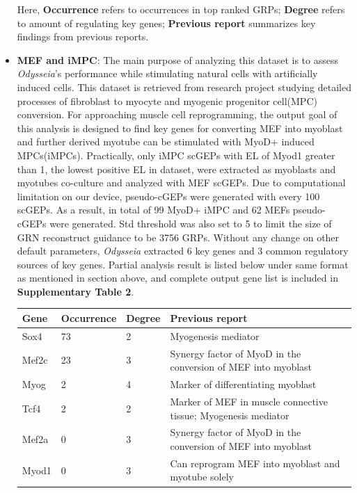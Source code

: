 \documentclass[fleqn,10pt]{wlscirep}
\begin{document}
\begin{itemize}
Here, \textbf{Occurrence} refers to occurrences in top ranked GRPs; \textbf{Degree} refers to amount of regulating key genes; \textbf{Previous report} summarizes key findings from previous reports.

\item \textbf{MEF and iMPC}:
The main purpose of analyzing this dataset is to assess \emph{Odysseia}'s performance while stimulating natural cells with artificially induced cells.
This dataset is retrieved from research project studying detailed processes of fibroblast to myocyte and myogenic progenitor cell(MPC) conversion.\cite{mef_iMPC_ETH}
For approaching muscle cell reprogramming, the output goal of this analysis is designed to find key genes for converting MEF into myoblast and further derived myotube can be stimulated with MyoD+ induced MPCs(iMPCs)\cite{mpc_as_myoblast}.
Practically, only iMPC scGEPs with EL of Myod1 greater than 1, the lowest positive EL in dataset, were extracted as myoblasts and myotubes co-culture and analyzed with MEF scGEPs.
Due to computational limitation on our device, pseudo-cGEPs were generated with every 100 scGEPs.
As a result, in total of 99 MyoD+ iMPC and 62 MEFs pseudo-cGEPs were generated.
Std threshold was also set to 5 to limit the size of GRN reconstruct guidance to be 3756 GRPs.
Without any change on other default parameters, \emph{Odysseia} extracted 6 key genes and 3 common regulatory sources of key genes.
Partial analysis result is listed below under same format as mentioned in section above, and complete output gene list is included in \textbf{Supplementary Table 2}.

\begin{table}[ht]
\centering
\begin{tabular}{|l|l|l|l|}
\hline
\textbf{Gene} & \textbf{Occurrence} & \textbf{Degree} & \textbf{Previous report}  \\
\hline
Sox4 & 73 & 2 & Myogenesis mediator\cite{sox4_2013, myogenic_repro_2018} \\
\hline
Mef2c & 23 & 3 & Synergy factor of MyoD in the conversion of MEF into myoblast\cite{mef2_2017, mef2_skeletal}\\
\hline
Myog & 2 & 4 & Marker of differentiating myoblast\cite{myog_1996, myog_2017} \\
\hline
Tcf4 & 2 & 2 & Marker of MEF in muscle connective tissue; Myogenesis mediator\cite{tcf4_2011, tcf4_2016, tcf4_2017}\\
\hline
Mef2a & 0 & 3 & Synergy factor of MyoD in the conversion of MEF into myoblast\cite{mef2_2017, mef2_skeletal}\\
\hline
Myod1 & 0 & 3 & Can reprogram MEF into myoblast and myotube solely\cite{mef_iMPC_ETH, myod_1990, myod_crispr} \\
\hline
\end{tabular}
\end{table}


\end{itemize}
\end{document}
